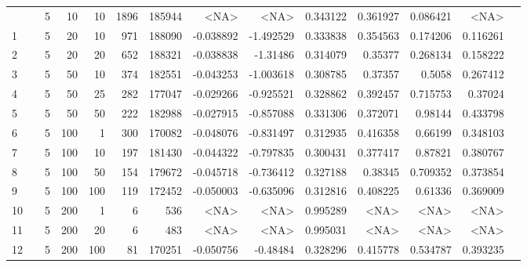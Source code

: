 \begin{longtable}{llrrrrrrrrrrrr}
	\bottomrule
	\endlastfoot
		0   & \multirow[t]{74}{*}{\rotatebox[origin=r]{90}{sbert-default}} &            5 &                10 &           10 &        1896 &     185944 &      <NA> &      <NA> &  0.343122 &    0.361927 &       0.086421 &  <NA> \\
		1   & &            5 &                20 &           10 &         971 &     188090 & -0.038892 & -1.492529 &  0.333838 &    0.354563 &       0.174206 &  0.116261 \\
		2   & &            5 &                20 &           20 &         652 &     188321 & -0.038838 &  -1.31486 &  0.314079 &     0.35377 &       0.268134 &  0.158222 \\
		3   & &            5 &                50 &           10 &         374 &     182551 & -0.043253 & -1.003618 &  0.308785 &     0.37357 &         0.5058 &  0.267412 \\
		4   & &            5 &                50 &           25 &         282 &     177047 & -0.029266 & -0.925521 &  0.328862 &    0.392457 &       0.715753 &   0.37024 \\
		5   & &            5 &                50 &           50 &         222 &     182988 & -0.027915 & -0.857088 &  0.331306 &    0.372071 &        0.98144 &  0.433798 \\
		6   & &            5 &               100 &            1 &         300 &     170082 & -0.048076 & -0.831497 &  0.312935 &    0.416358 &        0.66199 &  0.348103 \\
		7   & &            5 &               100 &           10 &         197 &     181430 & -0.044322 & -0.797835 &  0.300431 &    0.377417 &        0.87821 &  0.380767 \\
		8   & &            5 &               100 &           50 &         154 &     179672 & -0.045718 & -0.736412 &  0.327188 &     0.38345 &       0.709352 &  0.373854 \\
		9   & &            5 &               100 &          100 &         119 &     172452 & -0.050003 & -0.635096 &  0.312816 &    0.408225 &        0.61336 &  0.369009 \\
		10  & &            5 &               200 &            1 &              6 &        536 &      <NA> &      <NA> &  0.995289 &        <NA> &           <NA> &      <NA> \\
		11  & &            5 &               200 &           20 &              6 &        483 &      <NA> &      <NA> &  0.995031 &        <NA> &           <NA> &      <NA> \\
		12  & &            5 &               200 &          100 &          81 &     170251 & -0.050756 &  -0.48484 &  0.328296 &    0.415778 &       0.534787 &  0.393235 \\

\end{longtable}

